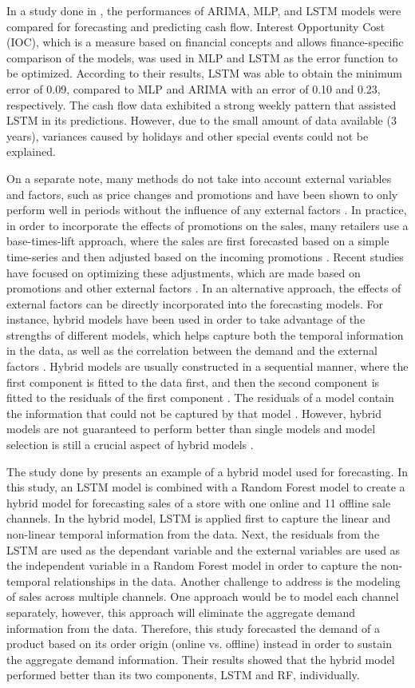 In a study done in \cite{c11}, the performances of ARIMA, MLP, and LSTM models were compared for forecasting and predicting cash flow.
Interest Opportunity Cost (IOC), which is a measure based on financial concepts and allows finance-specific comparison of the models, was used in MLP and LSTM as the error function to be optimized.
According to their results, LSTM was able to obtain the minimum error of 0.09, compared to MLP and ARIMA with an error of 0.10 and 0.23, respectively.
The cash flow data exhibited a strong weekly pattern that assisted LSTM in its predictions. 
However, due to the small amount of data available (3 years), variances caused by holidays and other special events could not be explained.

On a separate note, many methods do not take into account external variables and factors, such as price changes and promotions and have been shown to only perform well in periods without the influence of any external factors \cite{c2, c3}. 
In practice, in order to incorporate the effects of promotions on the sales, many retailers use a base-times-lift approach, where the sales are first forecasted based on a simple time-series and then adjusted based on the incoming promotions \cite{c4}. 
Recent studies have focused on optimizing these adjustments, which are made based on promotions and other external factors \cite{c4}. 
In an alternative approach, the effects of external factors can be directly incorporated into the forecasting models.
For instance, hybrid models have been used in order to take advantage of the strengths of different models, which helps capture both the temporal information in the data, as well as the correlation between the demand and the external factors \cite{c5, c8}. 
Hybrid models are usually constructed in a sequential manner, where the first component is fitted to the data first, and then the second component is fitted to the residuals of the first component \cite{c12}.
The residuals of a model contain the information that could not be captured by that model \cite{c8}.
However, hybrid models are not guaranteed to perform better than single models and model selection is still a crucial aspect of hybrid models \cite{c12}.

The study done by \cite{c8} presents an example of a hybrid model used for forecasting. 
In this study, an LSTM model is combined with a Random Forest model to create a hybrid model for forecasting sales of a store with one online and 11 offline sale channels.
In the hybrid model, LSTM is applied first to capture the linear and non-linear temporal information from the data. 
Next, the residuals from the LSTM are used as the dependant variable and the external variables are used as the independent variable in a Random Forest model in order to capture the non-temporal relationships in the data. 
Another challenge to address is the modeling of sales across multiple channels. 
One approach would be to model each channel separately, however, this approach will eliminate the aggregate demand information from the data. 
Therefore, this study forecasted the demand of a product based on its order origin (online vs. offline) instead in order to sustain the aggregate demand information.
Their results showed that the hybrid model performed better than its two components, LSTM and RF, individually. 